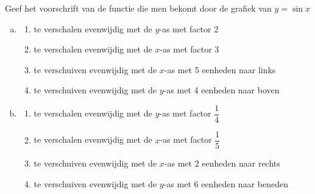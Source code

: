 \documentclass[a4paper,12pt,twoside ]{article}
\begin{document}
\begin{oefening}Geef het voorschrift van de functie die men bekomt door de grafiek van $y=\sin x$
  \begin{enumerate}[(a)]
    \item
    \begin{enumerate}[$\rightarrow$]
      \itemsep0.8em
      \item te verschalen evenwijdig met de $y$-as met factor 2
      \item te verschalen evenwijdig met de $x$-as met factor 3
      \item te verschuiven evenwijdig met de $x$-as met 5 eenheden naar links
      \item te verschuiven evenwijdig met de $y$-as met 4 eenheden naar boven
    \end{enumerate}
    \item
    \begin{enumerate}[$\rightarrow$]
      \itemsep0.8em
      \item te verschalen evenwijdig met de $y$-as met factor $\dfrac{1}{4}$
      \item te verschalen evenwijdig met de $x$-as met factor $\dfrac{1}{5}$
      \item te verschuiven evenwijdig met de $x$-as met 2 eenheden naar rechts
      \item te verschuiven evenwijdig met de $y$-as met 6 eenheden naar beneden
    \end{enumerate}
  \end{enumerate}
\end{oefening}
\end{document}
